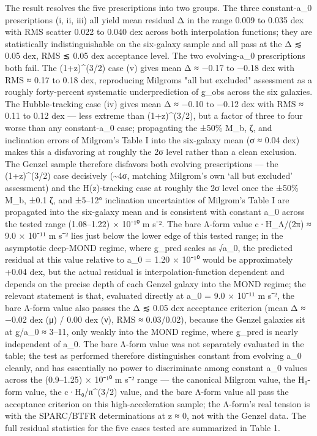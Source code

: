\documentclass[11pt]{article}
\begin{document}
The result resolves the five prescriptions into two groups. The three constant-a\_0 prescriptions (i, ii, iii) all yield mean residual \textbar Δ\textbar{} in the range 0.009 to 0.035 dex with RMS scatter 0.022 to 0.040 dex across both interpolation functions; they are statistically indistinguishable on the six-galaxy sample and all pass at the \textbar Δ\textbar{} ≲ 0.05 dex, RMS ≲ 0.05 dex acceptance level. The two evolving-a\_0 prescriptions both fail. The (1+z)\^{}(3/2) case (v) gives mean Δ ≈ −0.17 to −0.18 dex with RMS ≈ 0.17 to 0.18 dex, reproducing Milgrom\textquotesingle s "all but excluded" assessment as a roughly forty-percent systematic underprediction of g\_obs across the six galaxies. The Hubble-tracking case (iv) gives mean Δ ≈ −0.10 to −0.12 dex with RMS ≈ 0.11 to 0.12 dex --- less extreme than (1+z)\^{}(3/2), but a factor of three to four worse than any constant-a\_0 case; propagating the ±50\% M\_b, ζ, and inclination errors of Milgrom's Table I into the six-galaxy mean (σ ≈ 0.04 dex) makes this a disfavoring at roughly the 2σ level rather than a clean exclusion. The Genzel sample therefore disfavors both evolving prescriptions --- the (1+z)\^{}(3/2) case decisively (\textasciitilde4σ, matching Milgrom's own `all but excluded' assessment) and the H(z)-tracking case at roughly the 2σ level once the ±50\% M\_b, ±0.1 ζ, and ±5--12° inclination uncertainties of Milgrom's Table I are propagated into the six-galaxy mean and is consistent with constant a\_0 across the tested range (1.08--1.22) × 10⁻¹⁰ m s⁻². The bare Λ-form value c·H\_Λ/(2π) ≈ 9.0 × 10⁻¹¹ m s⁻² lies just below the lower edge of this tested range; in the asymptotic deep-MOND regime, where g\_pred scales as √a\_0, the predicted residual at this value relative to a\_0 = 1.20 × 10⁻¹⁰ would be approximately +0.04 dex, but the actual residual is interpolation-function dependent and depends on the precise depth of each Genzel galaxy into the MOND regime; the relevant statement is that, evaluated directly at a\_0 = 9.0 × 10⁻¹¹ m s⁻², the bare Λ-form value also passes the \textbar Δ\textbar{} ≲ 0.05 dex acceptance criterion (mean Δ ≈ −0.02 dex (μ) / 0.00 dex (ν), RMS ≈ 0.03/0.02), because the Genzel galaxies sit at g/a\_0 ≈ 3--11, only weakly into the MOND regime, where g\_pred is nearly independent of a\_0. The bare Λ-form value was not separately evaluated in the table; the test as performed therefore distinguishes constant from evolving a\_0 cleanly, and has essentially no power to discriminate among constant a\_0 values across the (0.9--1.25) × 10⁻¹⁰ m s⁻² range --- the canonical Milgrom value, the H₀-form value, the c·H₀/π\^{}(3/2) value, and the bare Λ-form value all pass the acceptance criterion on this high-acceleration sample; the Λ-form's real tension is with the SPARC/BTFR determinations at z ≈ 0, not with the Genzel data. The full residual statistics for the five cases tested are summarized in Table 1.
\end{document}
